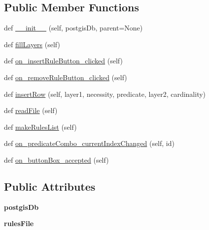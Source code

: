 \subsection*{Public Member Functions}
\begin{DoxyCompactItemize}
\item 
def \mbox{\hyperlink{class_dsg_tools_1_1_validation_tools_1_1rules__editor_1_1_rules_editor_adb9f3d4c402e7ce3934461fc1545935a}{\+\_\+\+\_\+init\+\_\+\+\_\+}} (self, postgis\+Db, parent=None)
\item 
def \mbox{\hyperlink{class_dsg_tools_1_1_validation_tools_1_1rules__editor_1_1_rules_editor_a7f008ec4a36f3232ac3fa2d009226247}{fill\+Layers}} (self)
\item 
def \mbox{\hyperlink{class_dsg_tools_1_1_validation_tools_1_1rules__editor_1_1_rules_editor_a0e17e38094800661106fa99e6b557413}{on\+\_\+insert\+Rule\+Button\+\_\+clicked}} (self)
\item 
def \mbox{\hyperlink{class_dsg_tools_1_1_validation_tools_1_1rules__editor_1_1_rules_editor_a1ff924e4f1f0ac5c03a5848890a95855}{on\+\_\+remove\+Rule\+Button\+\_\+clicked}} (self)
\item 
def \mbox{\hyperlink{class_dsg_tools_1_1_validation_tools_1_1rules__editor_1_1_rules_editor_aca3554038ae050551f7fffb5cb9bd7fd}{insert\+Row}} (self, layer1, necessity, predicate, layer2, cardinality)
\item 
def \mbox{\hyperlink{class_dsg_tools_1_1_validation_tools_1_1rules__editor_1_1_rules_editor_aa15c2337138799088f04093a543d3112}{read\+File}} (self)
\item 
def \mbox{\hyperlink{class_dsg_tools_1_1_validation_tools_1_1rules__editor_1_1_rules_editor_a8b098bf9c7bfb628789f3bb23f122d9c}{make\+Rules\+List}} (self)
\item 
def \mbox{\hyperlink{class_dsg_tools_1_1_validation_tools_1_1rules__editor_1_1_rules_editor_ae4d39e73ad5510aa950766ef75686ac1}{on\+\_\+predicate\+Combo\+\_\+current\+Index\+Changed}} (self, id)
\item 
def \mbox{\hyperlink{class_dsg_tools_1_1_validation_tools_1_1rules__editor_1_1_rules_editor_a6be23e41b64b56984b901dc1241f0e34}{on\+\_\+button\+Box\+\_\+accepted}} (self)
\end{DoxyCompactItemize}
\subsection*{Public Attributes}
\begin{DoxyCompactItemize}
\item 
\mbox{\label{class_dsg_tools_1_1_validation_tools_1_1rules__editor_1_1_rules_editor_ada40963ddcb796140ba6b8037209f60f}} 
{\bfseries postgis\+Db}
\item 
\mbox{\label{class_dsg_tools_1_1_validation_tools_1_1rules__editor_1_1_rules_editor_ac247bd8301afe39850bce9d54d630b43}} 
{\bfseries rules\+File}
\end{DoxyCompactItemize}


